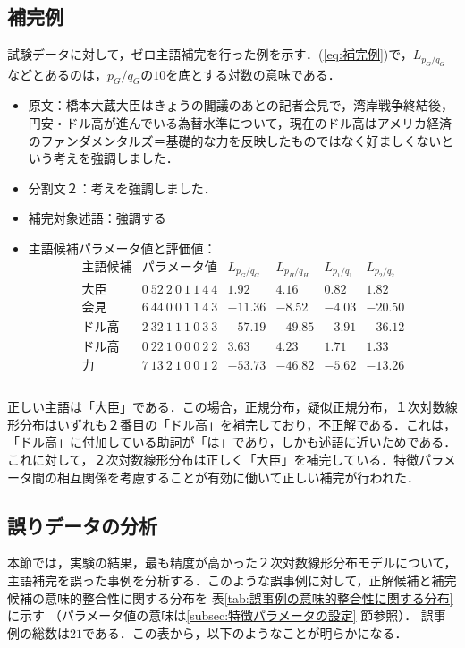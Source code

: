 \subsection{補完例}
試験データに対して，ゼロ主語補完を行った例を示す．(\ref{eq:補完例})で，$L_{p_{G}/q_{G}}$などとあるのは，$p_{G}/q_{G}$の$10$を底とする対数の意味である．
\begin{itemize}
\item 原文：橋本大蔵大臣はきょうの閣議のあとの記者会見で，湾岸戦争終結後，円安・ドル高が進んでいる為替水準について，現在のドル高はアメリカ経済のファンダメンタルズ＝基礎的な力を反映したものではなく好ましくないという考えを強調しました．
\item 分割文２：考えを強調しました．
\item 補完対象述語：強調する
\item 主語候補パラメータ値と評価値：
\begin{equation}
\begin{array}{lrrrrr} \nonumber
 主語候補 & パラメータ値 & L_{p_{G}/q_{G}} & L_{p_{H}/q_{H}} 
                         & L_{p_{1}/q_{1}} & L_{p_{2}/q_{2}} \\
 大臣　　 & 0\ 52\ 2\ 0\ 1\ 1\ 4\ 4 &   1.92 &   4.16 &  0.82 &   1.82 \\
 会見　　 & 6\ 44\ 0\ 0\ 1\ 1\ 4\ 3 & -11.36 &  -8.52 & -4.03 & -20.50 \\
 ドル高　 & 2\ 32\ 1\ 1\ 1\ 0\ 3\ 3 & -57.19 & -49.85 & -3.91 & -36.12 \\
 ドル高　 & 0\ 22\ 1\ 0\ 0\ 0\ 2\ 2 &   3.63 &   4.23 &  1.71 &   1.33 \\
 力　　　 & 7\ 13\ 2\ 1\ 0\ 0\ 1\ 2 & -53.73 & -46.82 & -5.62 & -13.26 \\ \\
\end{array}
\label{eq:補完例}
\end{equation}
\end{itemize}
正しい主語は「大臣」である．この場合，正規分布，疑似正規分布，１次対数線形分布はいずれも２番目の「ドル高」を補完しており，不正解である．これは，「ドル高」に付加している助詞が「は」であり，しかも述語に近いためである．これに対して，２次対数線形分布は正しく「大臣」を補完している．特徴パラメータ間の相互関係を考慮することが有効に働いて正しい補完が行われた．

\subsection{誤りデータの分析} \label{subsec:誤りデータの分析}
本節では，実験の結果，最も精度が高かった２次対数線形分布モデルについて，
主語補完を誤った事例を分析する．このような誤事例に対して，正解候補と補完
候補の意味的整合性に関する分布を
表\ref{tab:誤事例の意味的整合性に関する分布} に示す
（パラメータ値の意味は\ref{subsec:特徴パラメータの設定} 節参照）．
誤事例の総数は$21$である．この表から，以下のようなことが明らかになる．


